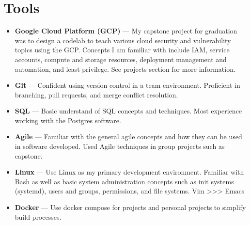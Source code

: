 \documentclass{article}
\begin{document}
\section{Tools}
\begin{itemize}
   \item \textbf{Google Cloud Platform (GCP)} --- My capstone project for graduation was to design a codelab to teach various cloud security
      and vulnerability topics using the GCP. Concepts I am familiar with include IAM, service accounts, compute and storage resources,
      deployment management and automation, and least privilege. See projects section for more information.
   \item \textbf{Git} --- Confident using version control in a team environment. Proficient in branching, pull requests, and merge conflict resolution.
   \item \textbf{SQL} --- Basic understand of SQL concepts and techniques. Most experience working with the Postgres software.
   \item \textbf{Agile} --- Familiar with the general agile concepts and how they can be used in software developed. Used Agile techniques
      in group projects such as capstone.
   \item \textbf{Linux} --- Use Linux as my primary development environment. Familiar with Bash as well as basic system administration concepts
      such as init systems (systemd), users and groups, permissions, and file systems. Vim >>> Emacs
   \item \textbf{Docker} --- Use docker compose for projects and personal projects to simplify build processes.
\end{itemize}
\end{document}
